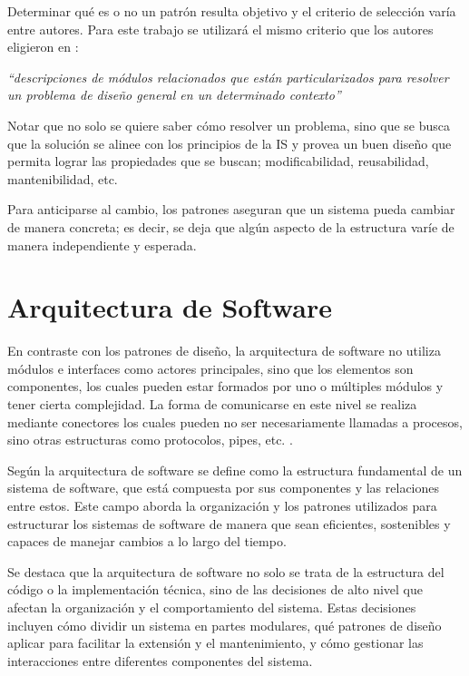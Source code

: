 Determinar qué es o no un patrón resulta objetivo y el criterio de selección varía entre autores. Para este trabajo se utilizará el mismo criterio que los autores eligieron en \cite{Gamma:1995:DPE:186897}:

\textit{``descripciones de módulos relacionados que están particularizados para resolver un problema de diseño general en un determinado contexto''}

Notar que no solo se quiere saber cómo resolver un problema, sino que se busca que la solución se alinee con los principios de la \gls{IS} y provea un buen diseño que permita lograr las propiedades que se buscan; modificabilidad, reusabilidad, mantenibilidad, etc.

Para anticiparse al cambio, los patrones aseguran que un sistema pueda cambiar de manera concreta; es decir, se deja que algún aspecto de la estructura varíe de manera independiente y esperada.


\section{Arquitectura de Software}
\label{secArq}

En contraste con los patrones de diseño, la arquitectura de software no utiliza módulos e interfaces como actores principales, sino que los elementos son componentes, los cuales pueden estar formados por uno o múltiples módulos y tener cierta complejidad. La forma de comunicarse en este nivel se realiza mediante conectores los cuales pueden no ser necesariamente llamadas a procesos, sino otras estructuras como protocolos, pipes, etc. \cite{bass2003, buschmann1996posa1}.

Según \cite{ShawGarlan1996} la arquitectura de software se define como la estructura fundamental de un sistema de software, que está compuesta por sus componentes y las relaciones entre estos. Este campo aborda la organización y los patrones utilizados para estructurar los sistemas de software de manera que sean eficientes, sostenibles y capaces de manejar cambios a lo largo del tiempo.

Se destaca que la arquitectura de software no solo se trata de la estructura del código o la implementación técnica, sino de las decisiones de alto nivel que afectan la organización y el comportamiento del sistema. Estas decisiones incluyen cómo dividir un sistema en partes modulares, qué patrones de diseño aplicar para facilitar la extensión y el mantenimiento, y cómo gestionar las interacciones entre diferentes componentes del sistema.

